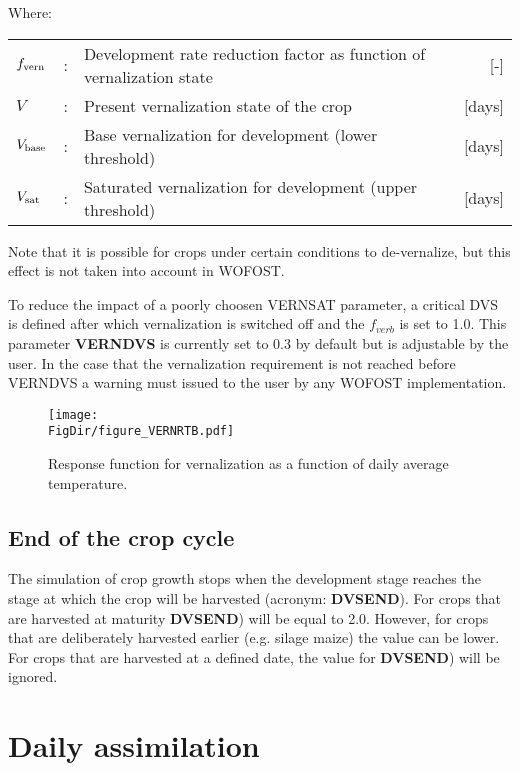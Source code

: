 Where:\\[5pt]
\begin{tabularx}{\textwidth}{llXr}
	$f_{{\rm vern}}$ &:& Development rate reduction factor as function of vernalization state   &     [-]\\
	$V$ &:& Present vernalization state of the crop   &     [days]\\
	$V_{{\rm base}}$ &:& Base vernalization for development (lower threshold)    &    [days]\\
	$V_{{\rm sat}}$ &:& Saturated vernalization for development (upper threshold)    &    [days]\\
\end{tabularx}

Note that it is possible for crops under certain conditions to de-vernalize, but this effect is not taken
into account in WOFOST.

To reduce the impact of a poorly choosen VERNSAT parameter, a critical DVS is defined after which 
vernalization is switched off and the $f_{verb}$ is set to 1.0. This parameter \textbf{VERNDVS}
is currently set to 0.3 by default but is adjustable by the user. In the case that the vernalization
requirement is not reached before VERNDVS a warning must issued to the user by any WOFOST implementation.

\begin{figure}[p]
	\centering
	\texttt{[image: \\FigDir/figure\_VERNRTB.pdf]}
	\caption{Response function for vernalization as a function
	of daily average temperature.} 
	\label{fig:VERNRTB}
\end{figure}

\subsection{End of the crop cycle}

The simulation of crop growth stops when the development stage reaches the stage at
which the crop will be harvested (acronym: {\bf DVSEND}). For crops that are harvested
at maturity {\bf DVSEND}) will be equal to 2.0. However, for crops that are deliberately
harvested earlier (e.g. silage maize) the value can be lower. For crops that are harvested
at a defined date, the value for {\bf DVSEND}) will be ignored.

\section{Daily assimilation} 

